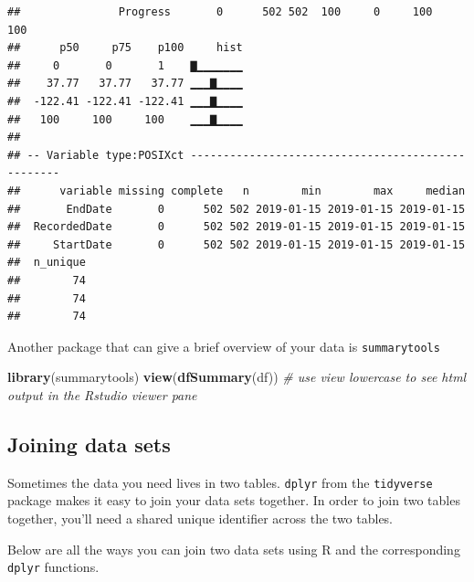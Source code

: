 \documentclass[]{book}
\newenvironment{Shaded}{\begin{snugshade}}{\end{snugshade}}
\newcommand{\CommentTok}[1]{\textcolor[rgb]{0.56,0.35,0.01}{\textit{#1}}}
\newcommand{\KeywordTok}[1]{\textcolor[rgb]{0.13,0.29,0.53}{\textbf{#1}}}
\newcommand{\NormalTok}[1]{#1}
\begin{document}
\begin{verbatim}
##               Progress       0      502 502  100     0     100     100   
##      p50     p75    p100     hist
##     0       0       1    ▇▁▁▁▁▁▁▁
##    37.77   37.77   37.77 ▁▁▁▇▁▁▁▁
##  -122.41 -122.41 -122.41 ▁▁▁▇▁▁▁▁
##   100     100     100    ▁▁▁▇▁▁▁▁
## 
## -- Variable type:POSIXct --------------------------------------------------
##      variable missing complete   n        min        max     median
##       EndDate       0      502 502 2019-01-15 2019-01-15 2019-01-15
##  RecordedDate       0      502 502 2019-01-15 2019-01-15 2019-01-15
##     StartDate       0      502 502 2019-01-15 2019-01-15 2019-01-15
##  n_unique
##        74
##        74
##        74
\end{verbatim}

Another package that can give a brief overview of your data is \texttt{summarytools}

\begin{Shaded}
\begin{Highlighting}[]
\KeywordTok{library}\NormalTok{(summarytools)}
\KeywordTok{view}\NormalTok{(}\KeywordTok{dfSummary}\NormalTok{(df)) }\CommentTok{# use view lowercase to see html output in the Rstudio viewer pane}
\end{Highlighting}
\end{Shaded}

\hypertarget{joining-data-sets}{%
\subsection{Joining data sets}\label{joining-data-sets}}

Sometimes the data you need lives in two tables. \texttt{dplyr} from the \texttt{tidyverse} package makes it easy to join your data sets together. In order to join two tables together, you'll need a shared unique identifier across the two tables.

Below are all the ways you can join two data sets using R and the corresponding \texttt{dplyr} functions.
\end{document}
